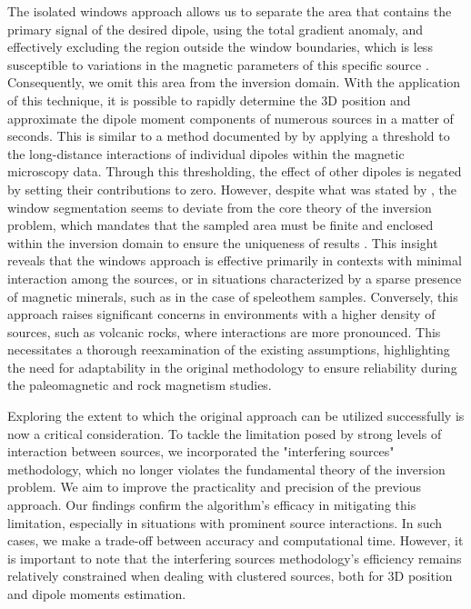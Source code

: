 The isolated windows approach allows us to separate the area that contains the primary signal of the desired dipole, using the total gradient anomaly, and effectively excluding the region outside the window boundaries, which is less susceptible to variations in the magnetic parameters of this specific source \citep{Souza-Junior2023b}. Consequently, we omit this area from the inversion domain. With the application of this technique, it is possible to rapidly determine the 3D position and approximate the dipole moment components of numerous sources in a matter of seconds. This is similar to a method documented by \cite{Weiss2007} by applying a threshold to the long-distance interactions of individual dipoles within the magnetic microscopy data. Through this thresholding, the effect of other dipoles is negated by setting their contributions to zero. However, despite what was stated by \cite{Souza-Junior2023b}, the window segmentation seems to deviate from the core theory of the inversion problem, which mandates that the sampled area must be finite and enclosed within the inversion domain to ensure the uniqueness of results \citep{Baratchart2013, Lima2013}. This insight reveals that the windows approach is effective primarily in contexts with minimal interaction among the sources, or in situations characterized by a sparse presence of magnetic minerals, such as in the case of speleothem samples. Conversely, this approach raises significant concerns in environments with a higher density of sources, such as volcanic rocks, where interactions are more pronounced. This necessitates a thorough reexamination of the existing assumptions, highlighting the need for adaptability in the original methodology to ensure reliability during the paleomagnetic and rock magnetism studies.

Exploring the extent to which the original approach can be utilized successfully is now a critical consideration. To tackle the limitation posed by strong levels of interaction between sources, we incorporated the "interfering sources" methodology, which no longer violates the fundamental theory of the inversion problem. We aim to improve the practicality and precision of the previous approach. Our findings confirm the algorithm's efficacy in mitigating this limitation, especially in situations with prominent source interactions. In such cases, we make a trade-off between accuracy and computational time. However, it is important to note that the interfering sources methodology's efficiency remains relatively constrained when dealing with clustered sources, both for 3D position and dipole moments estimation.

